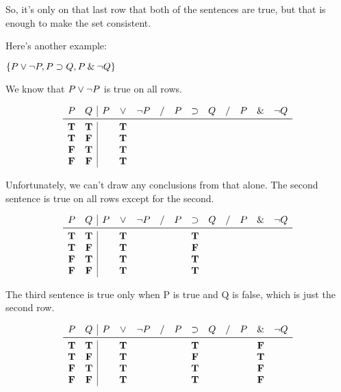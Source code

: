 \documentclass[../logic-text.tex]{subfiles}
\begin{document}
So, it's only on that last row that both of the sentences are true, but that is enough to make the set consistent.


Here's another example:

\( \{P \lor \neg P, P \supset Q, P \mathbin{\&} \neg Q\}\)

We know that \(P \lor \neg P\) is true on all rows.

\[
\begin{array}{cc|ccccccccccc}
  P & Q & P & \lor & \lneg P &/& P & \lif & Q &/& P & \land & \lneg Q \\ \midrule
  \true & \true && \true &&&&&&&&& \\
  \true & \false && \true &&&&&&&&& \\
  \false & \true && \true &&&&&&&&& \\
  \false & \false && \true &&&&&&&&& \\
\end{array}
\]


Unfortunately, we can't draw any conclusions from that alone.
The second sentence is true on all rows except for the second.

\[
\begin{array}{cc|ccccccccccc}
  P & Q & P & \lor & \lneg P &/& P & \lif & Q &/& P & \land & \lneg Q \\ \midrule
  \true & \true && \true &&& & \true &&&&& \\
  \true & \false && \true &&&& \false &&&&& \\
  \false & \true && \true &&&& \true &&&&& \\
  \false & \false && \true &&&& \true &&&&& \\
\end{array}
\]

The third sentence is true only when P is true and Q is false, which is just the second row.

\[
\begin{array}{cc|ccccccccccc}
  P & Q & P & \lor & \lneg P &/& P & \lif & Q &/& P & \land & \lneg Q \\ \midrule
  \true & \true && \true &&& & \true &&&& \false & \\
  \true & \false && \true &&&& \false &&&& \true & \\
  \false & \true && \true &&&& \true &&&& \false & \\
  \false & \false && \true &&&& \true &&&& \false & \\
\end{array}
\]
\end{document}
